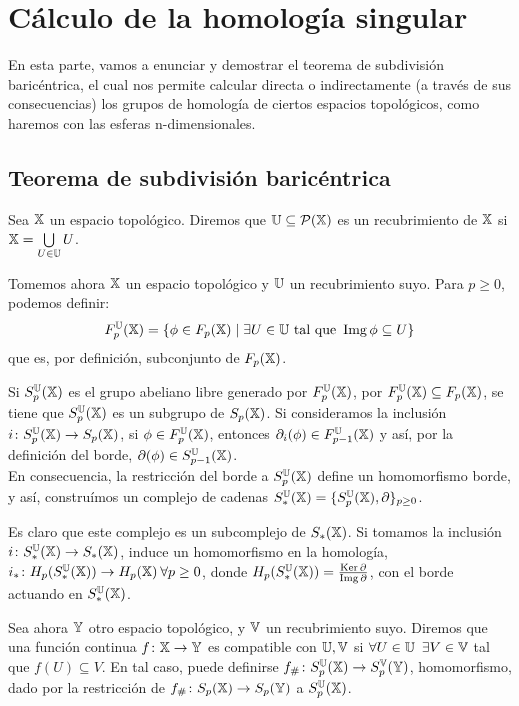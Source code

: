 \chapter{Cálculo de la homología singular}\label{ch:calculoI}

En esta parte, vamos a enunciar y demostrar el teorema de subdivisión baricéntrica,
el cual nos permite calcular directa o indirectamente (a través de sus consecuencias)
los grupos de homología de ciertos espacios topológicos, como haremos con las esferas
n-dimensionales.

\section{Teorema de subdivisión baricéntrica}

\begin{definition}
  Sea ${\mathbb X}$ un espacio topológico. Diremos que ${\mathbb U} \subseteq \mathcal P({\mathbb X})$ es un recubrimiento de ${\mathbb X}$ si ${\mathbb X} = \bigcup\limits_{U \in {\mathbb U}} U$.
\end{definition}

Tomemos ahora ${\mathbb X}$ un espacio topológico y ${\mathbb U}$ un recubrimiento suyo. Para $ p \geq 0$, podemos definir:
\[ F_p^{\mathbb U}({\mathbb X}) = \{\phi \in F_p({\mathbb X}) \mid \exists U \in {\mathbb U} \text{ tal que } \operatorname{Img} \phi \subseteq U\} \]
que es, por definición, subconjunto de $F_p({\mathbb X})$.

Si $S_p^{\mathbb U}({\mathbb X})$ es el grupo abeliano libre generado por $F_p^{\mathbb U}({\mathbb X})$, por $F_p^{\mathbb U}({\mathbb X}) \subseteq F_p({\mathbb X})$, se tiene
que $S_p^{\mathbb U}({\mathbb X})$ es un subgrupo de $S_p({\mathbb X})$. Si consideramos la inclusión $i \colon S_p^{\mathbb U}({\mathbb X}) \to S_p({\mathbb X})$, si
$\phi \in F_p^{\mathbb U}({\mathbb X})$, entonces $\partial_i(\phi) \in F_{p-1}^{\mathbb U}({\mathbb X})$ y así, por la definición del borde, $\partial(\phi) \in S_{p-1}^{\mathbb U}({\mathbb X})$. \\
En consecuencia, la restricción del borde a $S_p^{\mathbb U}({\mathbb X})$ define un homomorfismo borde, y así, construímos un complejo
de cadenas $S_*^{\mathbb U}({\mathbb X}) = \{S_p^{\mathbb U}({\mathbb X}), \partial\}_{p \geq 0}$.

Es claro que este complejo es un subcomplejo de $S_*({\mathbb X})$. Si tomamos la inclusión $i \colon S_*^{\mathbb U}({\mathbb X}) \to S_*({\mathbb X})$, induce un
homomorfismo en la homología, $i_* \colon H_p(S_*^{\mathbb U}({\mathbb X})) \to H_p({\mathbb X}) \hspace{0.2em} \forall p \geq 0$, donde
$H_p(S_*^{\mathbb U}({\mathbb X})) = \frac{\operatorname{Ker} \partial}{\operatorname{Img} \partial}$, con el borde actuando en $S_*^{\mathbb U}({\mathbb X})$.

Sea ahora ${\mathbb Y}$ otro espacio topológico, y ${\mathbb V}$ un recubrimiento suyo. Diremos que una función continua $f \colon {\mathbb X} \to {\mathbb Y}$ es compatible
con ${\mathbb U}, {\mathbb V}$ si $\forall U \in {\mathbb U} \hspace{0.5em} \exists V \in {\mathbb V}$ tal que $f(U) \subseteq V$. En tal caso, puede definirse
$f_\# \colon S_p^{\mathbb U}({\mathbb X}) \to S_p^{\mathbb V}({\mathbb Y})$, homomorfismo, dado por la restricción de $f_\# \colon S_{p}({\mathbb X}) \to S_{p}({\mathbb Y})$ a $S_p^{\mathbb U}({\mathbb X})$.

